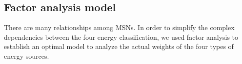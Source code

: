 \documentclass[a4paper,11pt]{article}
\begin{document}




\subsection{Factor analysis model}

\par There are many relationships among MSNs. In order to simplify the complex dependencies between the four energy classification, we used factor analysis to establish an optimal model to analyze the actual weights of the four types of energy sources.

\end{document}
